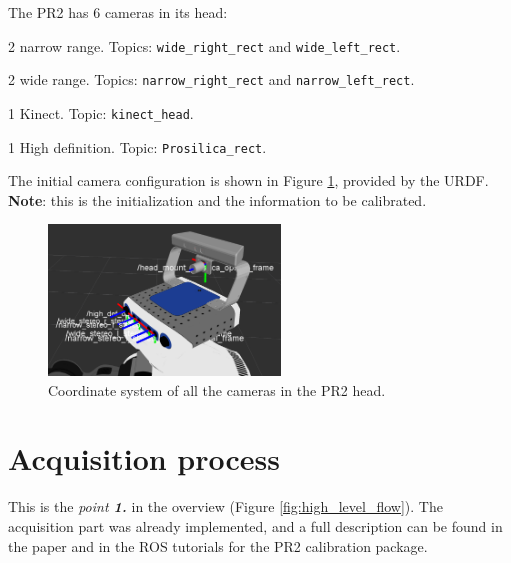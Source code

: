 The PR2 has 6 cameras in its head:
\begin{itemize*}
 \item 2 narrow range. Topics: \texttt{wide\_right\_rect} and \texttt{wide\_left\_rect}.
 \item 2 wide range. Topics: \texttt{narrow\_right\_rect} and \texttt{narrow\_left\_rect}.
 \item 1 Kinect. Topic: \texttt{kinect\_head}.
 \item 1 High definition. Topic: \texttt{Prosilica\_rect}.
\end{itemize*}

\noindent
The initial camera configuration is shown in Figure \ref{fig:pr2_cameras}, provided by the URDF. \textbf{Note}: this is the initialization and the information to be calibrated.
\begin{figure}[!htbp]
 \centering
 \includegraphics[width=0.55\textwidth]{images/screenshots/PR2_cameras.png}
 \caption{Coordinate system of all the cameras in the PR2 head.}
 \label{fig:pr2_cameras}
\end{figure}






\section{Acquisition process}
\label{sec:acquisition}

This is the \textit{point \textbf{1.}} in the overview (Figure \ref{fig:high_level_flow}). The acquisition part was already implemented, and a full description can be found in the paper  \cite{pr2_calibration_paper} and in the ROS tutorials for the PR2 calibration package.

%


